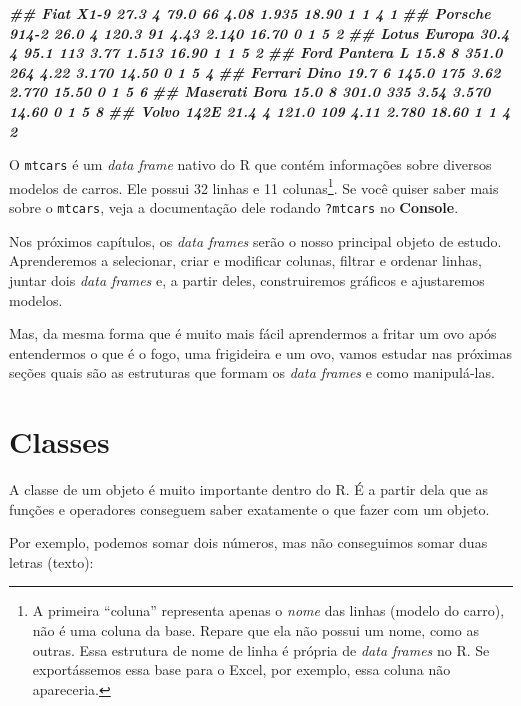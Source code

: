 \documentclass[
]{book}
\newenvironment{Shaded}{\begin{snugshade}}{\end{snugshade}}
\newcommand{\DocumentationTok}[1]{\textcolor[rgb]{0.56,0.35,0.01}{\textbf{\textit{#1}}}}
\begin{document}
\begin{Shaded}
\begin{Highlighting}[]
\DocumentationTok{\#\# Fiat X1{-}9           27.3   4  79.0  66 4.08 1.935 18.90  1  1    4    1}
\DocumentationTok{\#\# Porsche 914{-}2       26.0   4 120.3  91 4.43 2.140 16.70  0  1    5    2}
\DocumentationTok{\#\# Lotus Europa        30.4   4  95.1 113 3.77 1.513 16.90  1  1    5    2}
\DocumentationTok{\#\# Ford Pantera L      15.8   8 351.0 264 4.22 3.170 14.50  0  1    5    4}
\DocumentationTok{\#\# Ferrari Dino        19.7   6 145.0 175 3.62 2.770 15.50  0  1    5    6}
\DocumentationTok{\#\# Maserati Bora       15.0   8 301.0 335 3.54 3.570 14.60  0  1    5    8}
\DocumentationTok{\#\# Volvo 142E          21.4   4 121.0 109 4.11 2.780 18.60  1  1    4    2}
\end{Highlighting}
\end{Shaded}

O \texttt{mtcars} é um \emph{data frame} nativo do R que contém informações sobre diversos modelos de carros. Ele possui 32 linhas e 11 colunas\footnote{A primeira ``coluna'' representa apenas o \emph{nome} das linhas (modelo do carro), não é uma coluna da base. Repare que ela não possui um nome, como as outras. Essa estrutura de nome de linha é própria de \emph{data frames} no R. Se exportássemos essa base para o Excel, por exemplo, essa coluna não apareceria.}. Se você quiser saber mais sobre o \texttt{mtcars}, veja a documentação dele rodando \texttt{?mtcars} no \textbf{Console}.

Nos próximos capítulos, os \emph{data frames} serão o nosso principal objeto de estudo. Aprenderemos a selecionar, criar e modificar colunas, filtrar e ordenar linhas, juntar dois \emph{data frames} e, a partir deles, construiremos gráficos e ajustaremos modelos.

Mas, da mesma forma que é muito mais fácil aprendermos a fritar um ovo após entendermos o que é o fogo, uma frigideira e um ovo, vamos estudar nas próximas seções quais são as estruturas que formam os \emph{data frames} e como manipulá-las.

\hypertarget{classes}{%
\section{Classes}\label{classes}}

A classe de um objeto é muito importante dentro do R. É a partir dela que as funções e operadores conseguem saber exatamente o que fazer com um objeto.

Por exemplo, podemos somar dois números, mas não conseguimos somar duas letras (texto):
\end{document}
